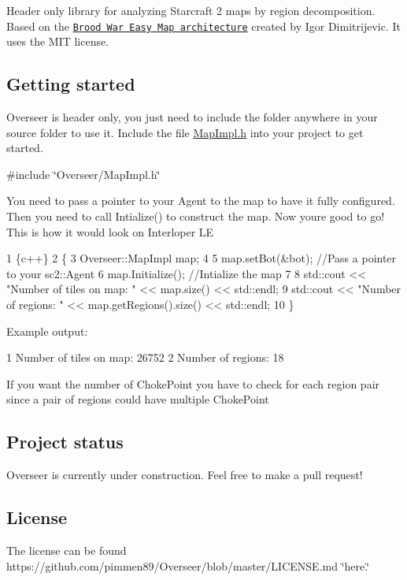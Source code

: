 \href{#features}{\tt }

Header only library for analyzing Starcraft 2 maps by region decomposition. Based on the \href{http://bwem.sourceforge.net/}{\tt Brood War Easy Map architecture} created by Igor Dimitrijevic. It uses the M\+IT license.

\subsection*{Getting started}

Overseer is header only, you just need to include the folder anywhere in your source folder to use it. Include the file {\ttfamily \hyperlink{MapImpl_8h_source}{Map\+Impl.\+h}} into your project to get started.

{\ttfamily \#include \char`\"{}\+Overseer/\+Map\+Impl.\+h\char`\"{}}

You need to pass a pointer to your Agent to the map to have it fully configured. Then you need to call {\ttfamily Intialize()} to construct the map. Now you\textquotesingle{}re good to go! This is how it would look on Interloper LE


\begin{DoxyCode}
1 \{c++\}
2 \{
3     Overseer::MapImpl map;
4 
5     map.setBot(&bot); //Pass a pointer to your sc2::Agent
6     map.Initialize(); //Intialize the map
7 
8     std::cout << "Number of tiles on map: " << map.size() << std::endl;
9     std::cout << "Number of regions: " << map.getRegions().size() << std::endl;
10 \}
\end{DoxyCode}


Example output\+:


\begin{DoxyCode}
1 Number of tiles on map: 26752
2 Number of regions: 18
\end{DoxyCode}


If you want the number of {\ttfamily Choke\+Point} you have to check for each region pair since a pair of regions could have multiple {\ttfamily Choke\+Point} \subsection*{Project status}

Overseer is currently under construction. Feel free to make a pull request!

\subsection*{License}

The license can be found https\+://github.com/pimmen89/\+Overseer/blob/master/\+L\+I\+C\+E\+N\+S\+E.\+md \char`\"{}here.\char`\"{} 
